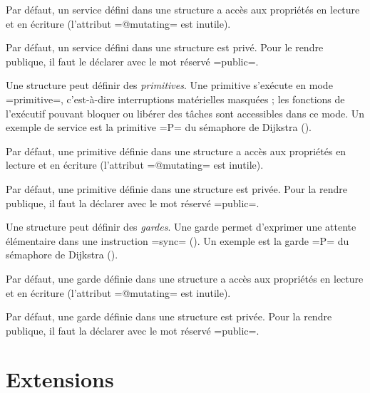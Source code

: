 Par défaut, un service défini dans une structure a accès aux propriétés en lecture et en écriture (l'attribut \plm=@mutating= est inutile).

Par défaut, un service défini dans une structure est privé. Pour le rendre publique, il faut le déclarer avec le mot réservé \plm=public=.










Une structure peut définir des \emph{primitives}. Une primitive s'exécute en mode \plm=primitive=, c'est-à-dire interruptions matérielles masquées ; les fonctions de l'exécutif pouvant bloquer ou libérer des tâches sont accessibles dans ce mode. Un exemple de service est la primitive \plm=P= du sémaphore de Dijkstra ().

Par défaut, une primitive définie dans une structure a accès aux propriétés en lecture et en écriture (l'attribut \plm=@mutating= est inutile).

Par défaut, une primitive définie dans une structure est privée. Pour la rendre publique, il faut la déclarer avec le mot réservé \plm=public=.










Une structure peut définir des \emph{gardes}. Une garde permet d'exprimer une attente élémentaire dans une instruction \plm=sync= (). Un exemple est la garde \plm=P= du sémaphore de Dijkstra ().

Par défaut, une garde définie dans une structure a accès aux propriétés en lecture et en écriture (l'attribut \plm=@mutating= est inutile).

Par défaut, une garde définie dans une structure est privée. Pour la rendre publique, il faut la déclarer avec le mot réservé \plm=public=.






\section{Extensions}

